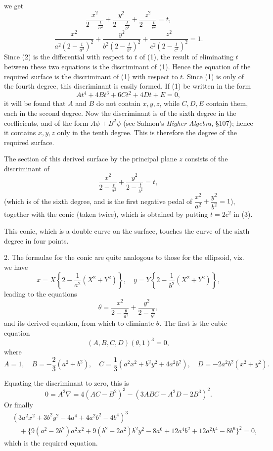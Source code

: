 \documentclass[10pt,twoside]{article}
\begin{document}
\noindent we get
\[
\frac{x^2}{2-\frac{t}{a^2}}+
\frac{y^2}{2-\frac{t}{b^2}}+
\frac{z^2}{2-\frac{t}{c^2}}=t \tag{1},
\]
\[
\frac{x^2}{a^2\left(2-\frac{t}{a^2}\right)^2}+
\frac{y^2}{b^2\left(2-\frac{t}{b^2}\right)^2}+
\frac{z^2}{c^2\left(2-\frac{t}{c^2}\right)^2}=1 \tag{2}.
\]
Since (2) is the differential with respect to \(t\) of (1), the result of eliminating \(t\) between these two equations is the discriminant of (1). Hence the equation of the required surface is the discriminant of (1) with respect to \(t\). Since (1) is only of the fourth degree, this discriminant is easily formed. If (1) be written in the form
\[
At^4+4Bt^3+6Ct^2+4Dt+E=0,
\]
it will be found that \(A\) and \(B\) do not contain \(x,y,z\), while \(C,D,E\) contain them, each in the second degree. Now the discriminant is of the sixth degree in the coefficients, and of the form \(A\phi+B^2\psi\) (see Salmon's \textit{Higher Algebra}, \S 107); hence it contains \(x,y,z\) only in the tenth degree. This is therefore the degree of the required surface.

The section of this derived surface by the principal plane \(z\) consists of the discriminant of
\[
\frac{x^2}{2-\frac{t}{a^2}}+\frac{y^2}{2-\frac{t}{b^2}}=t \tag{3},
\]
(which is of the sixth degree, and is the first negative pedal of \(\dfrac{x^2}{a^2}+\dfrac{y^2}{b^2}=1\)), together with the conic (taken twice), which is obtained by putting \(t=2c^2\) in (3).

This conic, which is a double curve on the surface, touches the curve of the sixth degree in four points.

2. The formulae for the conic are quite analogous to those for the ellipsoid, viz. we have
\[
x=X\left\{2-\frac{1}{a^2}(X^2+Y^2)\right\},\quad
y=Y\left\{2-\frac{1}{b^2}(X^2+Y^2)\right\},
\]
leading to the equations
\[
\theta=\frac{x^2}{2-\frac{\theta}{a^2}}+
\frac{y^2}{2-\frac{\theta}{b^2}},
\]
and its derived equation, from which to eliminate \(\theta\). The first is the cubic equation
\[
(A,B,C,D)(\theta,1)^3=0,
\]
where
\[
A=1,\quad B=-\frac{2}{3}(a^2+b^2),\quad
C=\frac{1}{3}(a^2x^2+b^2y^2+4a^2b^2),\quad
D=-2a^2b^2(x^2+y^2).
\]
\newpage

\noindent Equating the discriminant to zero, this is
\[
0=A^2\nabla=4(AC-B^2)^3-(3ABC-A^2D-2B^3)^2.
\]
Or finally
\[
\begin{split}
&(3a^2x^2+3b^2y^2-4a^4+4a^2b^2-4b^4)^3\\
&\quad+\{9(a^2-2b^2)a^2x^2+9(b^2-2a^2)b^2y^2
-8a^6+12a^4b^2+12a^2b^4-8b^6\}^2=0,
\end{split}
\]
which is the required equation.
\end{document}
